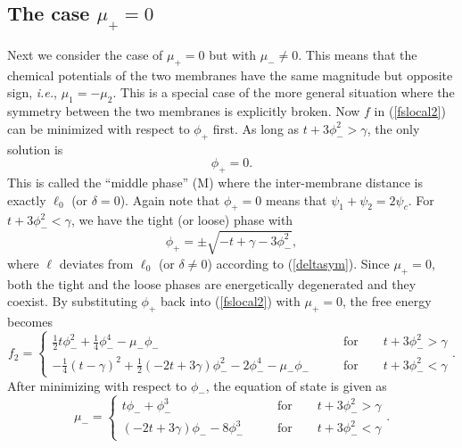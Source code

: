 \subsection{The case $\mu_+=0$}


Next we consider the case of $\mu_+=0$ but with
$\mu_- \neq 0$.
This means that the chemical potentials of the two membranes
have the same magnitude but opposite sign, {\it i.e.},
$\mu_1 = -\mu_2$.
This is a special case of the more general situation where
the symmetry between the two membranes is explicitly broken.
Now $f$ in (\ref{fslocal2}) can be minimized with respect to
$\phi_+$ first.
As long as $t+3\phi_-^2>\gamma$, the only solution is
%
\begin{equation}
\phi_+=0.
\end{equation}
%
This is called the ``middle phase'' (M) where the inter-membrane
distance is exactly $\ell_0$ (or $\delta=0$).
Again note that $\phi_+=0$ means that $\psi_1+\psi_2=2 \psi_c$.
For $t+3\phi_-^2<\gamma$, we have the tight (or loose) phase with
%
\begin{equation}
\phi_+ = \pm
\sqrt{-t + \gamma -3\phi_-^2},
\label{asymcoexist}
\end{equation}
%
where $\ell$ deviates from $\ell_0$ (or $\delta \neq 0$) according to
(\ref{deltasym}).
Since $\mu_+=0$, both the tight and the loose phases are energetically
degenerated and they coexist.
By substituting $\phi_+$ back into (\ref{fslocal2}) with $\mu_+=0$,
the free energy becomes
\begin{equation}
f_2 = \left\{
\begin{array}{lll}
\frac{1}{2}t \phi_-^2 + \frac{1}{4} \phi_-^4 - \mu_- \phi_-
& ~~~~~ & \mbox{for~~~~~ $t+3\phi_-^2>\gamma$} \\
-\frac{1}{4} \left(t - \gamma \right)^2 +
\frac{1}{2} \left( -2 t+ 3\gamma \right) \phi_-^2
- 2 \phi_-^4  - \mu_- \phi_-
& ~~~~~ & \mbox{for~~~~~ $t+3\phi_-^2<\gamma$}
\end{array} \right..
\end{equation}
After minimizing with respect to $\phi_-$, the equation of state is
given as
\begin{equation}
\mu_- = \left\{
\begin{array}{lll}
t \phi_- + \phi_-^3
& ~~~~~ & \mbox{for~~~~~ $t+3\phi_-^2>\gamma$} \\
\left( -2t + 3 \gamma \right) \phi_- - 8 \phi_-^3
& ~~~~~ & \mbox{for~~~~~ $t+3\phi_-^2<\gamma$}
\end{array} \right..
\end{equation}


